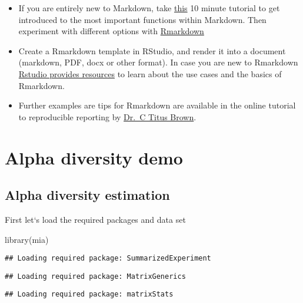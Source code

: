 \documentclass[
  oneside]{book}
\newenvironment{Shaded}{\begin{snugshade}}{\end{snugshade}}
\newcommand{\FunctionTok}[1]{\textcolor[rgb]{0.00,0.00,0.00}{#1}}
\newcommand{\NormalTok}[1]{#1}
\begin{document}
\begin{itemize}
\item
  If you are entirely new to Markdown, take
  \href{https://www.markdowntutorial.com/}{this} 10 minute tutorial to get
  introduced to the most important functions within Markdown. Then
  experiment with different options with
  \href{https://www.rstudio.com/wp-content/uploads/2015/02/rmarkdown-cheatsheet.pdf}{Rmarkdown}
\item
  Create a Rmarkdown template in RStudio, and render it into a
  document (markdown, PDF, docx or other format). In case you are new
  to Rmarkdown \href{https://rmarkdown.rstudio.com/lesson-1.html}{Rstudio provides
  resources} to learn
  about the use cases and the basics of Rmarkdown.
\item
  Further examples are tips for Rmarkdown are available in the
  online tutorial to reproducible reporting by \href{https://rpubs.com/marschmi/RMarkdown}{Dr.~C Titus
  Brown}.
\end{itemize}

\hypertarget{alpha-diversity-demo}{%
\chapter{Alpha diversity demo}\label{alpha-diversity-demo}}

\hypertarget{alpha-diversity-estimation}{%
\section{Alpha diversity estimation}\label{alpha-diversity-estimation}}

First let`s load the required packages and data set

\begin{Shaded}
\begin{Highlighting}[]
\FunctionTok{library}\NormalTok{(mia)}
\end{Highlighting}
\end{Shaded}

\begin{verbatim}
## Loading required package: SummarizedExperiment
\end{verbatim}

\begin{verbatim}
## Loading required package: MatrixGenerics
\end{verbatim}

\begin{verbatim}
## Loading required package: matrixStats
\end{verbatim}
\end{document}
